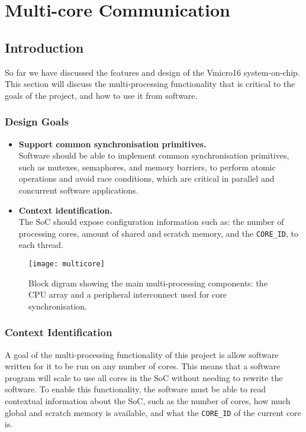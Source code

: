 
\chapter{Multi-core Communication}
\startcontents[chapters]

\section{Introduction}
So far we have discussed the features and design of the Vmicro16 system-on-chip. This section will discuss the multi-processing functionality that is critical to the goals of the project, and how to use it from software.

\subsection{Design Goals}
\begin{itemize}
\item \textbf{Support common synchronisation primitives.}\\
Software should be able to implement common synchronisation primitives, such as mutexes, semaphores, and memory barriers, to perform atomic operations and avoid race conditions, which are critical in parallel and concurrent software applications.

\item \textbf{Context identification.}\\
The SoC should expose configuration information such as: the number of processing cores, amount of shared and scratch memory, and the \verb|CORE_ID|, to each thread.

\end{itemize}


\begin{figure}[h]
\centering
\texttt{[image: multicore]}
\caption{Block digram showing the main multi-processing components: the CPU array and a peripheral interconnect used for core synchronisation.}
\label{fig:multicore}
\end{figure}

\subsection{Context Identification}
A goal of the multi-processing functionality of this project is allow software written for it to be run on any number of cores. This means that a software program will scale to use all cores in the SoC without needing to rewrite the software. To enable this functionality, the software must be able to read contextual information about the SoC, such as the number of cores, how much global and scratch memory is available, and what the \verb|CORE_ID| of the current core is. 

